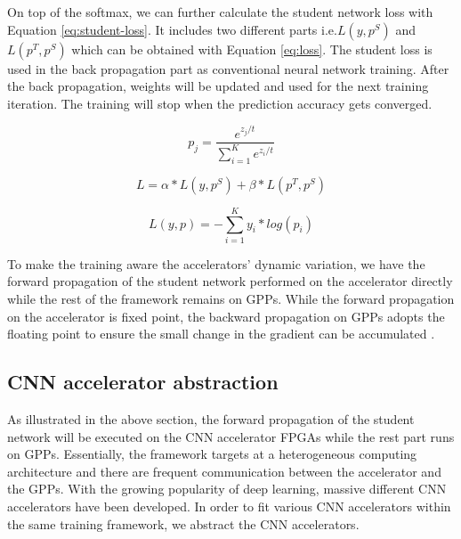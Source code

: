 On top of the softmax, we can further calculate the student 
network loss with Equation \ref{eq:student-loss}. It includes 
two different parts i.e.$L(y, p^S)$ and $L(p^T, p^S)$ which can be 
obtained with Equation \ref{eq:loss}. The student loss is used in the 
back propagation part as conventional neural network training. 
After the back propagation, weights will be updated and used for the 
next training iteration. The training will stop when the prediction 
accuracy gets converged.

\begin{equation}
	\label{eq:pt-calu}
p_j=\frac{e^{{z_j}/t}}{\sum_{i=1}^{K}e^{{z_i}/t}}
\end{equation}

\begin{equation}
	\label{eq:student-loss}
L=\alpha*L(y,p^S)+\beta*L(p^T,p^S)
\end{equation}

\begin{equation}
	\label{eq:loss}
L(y,p)=-\sum_{i=1}^{K}y_i*log(p_i)
\end{equation}


To make the training aware the accelerators' dynamic variation, 
we have the forward propagation of the student network 
performed on the accelerator directly while the rest of the 
framework remains on GPPs. While the forward propagation on 
the accelerator is fixed point, the backward propagation on 
GPPs adopts the floating point to ensure 
the small change in the gradient can be accumulated \cite{Matthieu2014_8}. 


\subsection{CNN accelerator abstraction}
As illustrated in the above section, the forward propagation of the 
student network will be executed on the CNN accelerator FPGAs while 
the rest part runs on GPPs. Essentially, the framework targets at a 
heterogeneous computing architecture and there are frequent 
communication between the accelerator and the GPPs. 
With the growing popularity of deep learning, massive different 
CNN accelerators have been developed. 
In order to fit various CNN accelerators within the same training framework,
we abstract the CNN accelerators.

